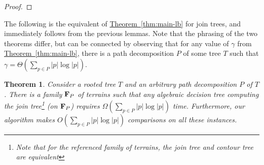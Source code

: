 \documentclass[11pt]{article}
\newtheorem{theorem}{Theorem}[section]
\theoremstyle{definition}
\newcommand{\bF}{{\bf F}}
\newcommand{\cJ}{{\cal J}}
\newcommand{\MM}{\mathbb{M}}
\newcommand{\Thm}[1]{\hyperref[thm:#1]{Theorem~\ref*{thm:#1}}} %
\newcommand{\jc}{\cJ_C}
\newcommand{\thmConst}{\gamma}
\begin{document}
\begin{proof}
% 
\end{proof}

The following is the equivalent of \Thm{main-lb} for join trees, and immediately follows from
the previous lemmas.  Note that the phrasing of the two theorems differ, but can be connected by observing that for any value of $\thmConst$ from \Thm{main-lb}, 
there is a path decomposition $P$ of some tree $T$ such that $\thmConst= \Theta(\sum_{p \in P} |p|\log |p|)$.


\begin{theorem}\label{thm:joinLB}
Consider a rooted tree $T$ and an arbitrary path decomposition $P$ of $T$.
There is a family $\bF_P$ of terrains such that any algebraic decision
tree computing the join tree\footnote{Note that for the referenced family of terrains, the join tree and contour tree are equivalent} 
(on $\bF_P$) requires $\Omega(\sum_{p \in P} |p|\log |p|)$ time.
Furthermore, our algorithm makes $O(\sum_{p \in P} |p|\log |p|)$ comparisons on all these instances.
%
\end{theorem}
\end{document}
